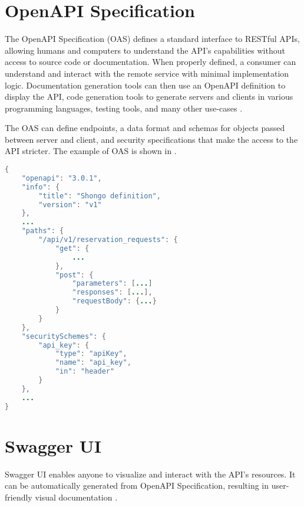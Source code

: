 \section{OpenAPI Specification} \label{sec:openapi}
The OpenAPI Specification (OAS) defines a standard interface to RESTful APIs, allowing humans and computers to understand the API’s capabilities without access to source code or documentation. When properly defined, a consumer can understand and interact with the remote service with minimal implementation logic.
Documentation generation tools can then use an OpenAPI definition to display the API, code generation tools to generate servers and clients in various programming languages, testing tools, and many other use-cases \cite{openapi}.

The OAS can define endpoints, a data format and schemas for objects passed between server and client, and security specifications that make the access to the API stricter.
The example of OAS is shown in .
\begin{lstlisting}[language=Java, caption=OpenAPI.json, label=lst:openapi]
{
    "openapi": "3.0.1",
    "info": {
        "title": "Shongo definition",
        "version": "v1"
    },
    ...
    "paths": {
        "/api/v1/reservation_requests": {
            "get": {
                ...
            },
            "post": {
                "parameters": [...]
                "responses": [...],
                "requestBody": {...}
            }
        }
    },
    "securitySchemes": {
        "api_key": {
            "type": "apiKey",
            "name": "api_key",
            "in": "header"
        }
    },
    ...
}
\end{lstlisting}

\section{Swagger UI} \label{sec:swagger}
Swagger UI enables anyone to visualize and interact with the API’s resources. It can be automatically generated from OpenAPI Specification, resulting in user-friendly visual documentation \cite{swagger}.
